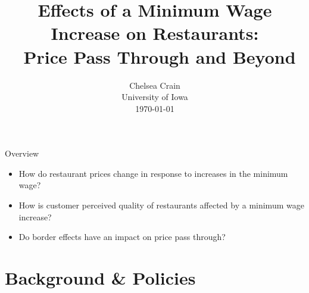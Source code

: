 \documentclass[xcolor=table]{beamer}
\title[Effects of a Minimum Wage Increase on Restaurants] %
{\large Effects of a Minimum Wage Increase on Restaurants: \\\
 Price Pass Through and Beyond}
\author[Chelsea Crain] %
{}
\institute[] %
\date %
{Chelsea Crain\\
University of Iowa\\
\today \\

}
\begin{document}
\begin{spacing}{1.2}
\begin{frame}
  \titlepage
\end{frame}



\begin{frame}{Overview}
\begin{itemize}
\item How do restaurant prices change in response to increases in the minimum wage?
\bigskip
\item  How is customer perceived quality of restaurants affected by a minimum wage increase?
\bigskip
\item Do border effects have an impact on price pass through?
\bigskip
\end{itemize}
\end{frame}

\section{Background \& Policies}


\end{spacing}
\end{document}
